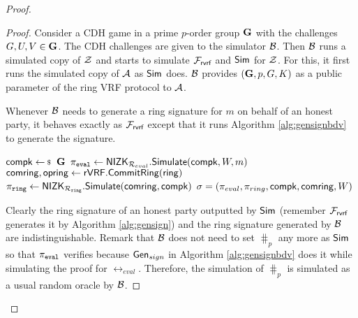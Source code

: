 \begin{proof}
\begin{proof}
			Consider a CDH game in a prime $ p $-order group  $ {\mathbf{G}} $ with the challenges $ G,U, V \in {\mathbf{G}}$. The CDH challenges are given to the simulator $ \mathcal{B} $. Then $ \mathcal{B} $ runs a simulated copy of $ \mathcal{Z} $ and starts to simulate $ \mathcal{F}_{\textsf{rvrf}} $ and $ \mathsf{Sim} $ for $ \mathcal{Z} $. For this, it first runs the simulated copy of $ \mathcal{A} $ as $ \mathsf{Sim} $ does. $ \mathcal{B} $ provides $ ({\mathbf{G}}, p, G , K) $ as a public parameter of the ring VRF protocol to $ \mathcal{A} $.
			
			Whenever $ \mathcal{B} $ needs to generate a ring signature for $ m $ on behalf of an honest party, it behaves exactly as $ \mathcal{F}_{\textsf{rvrf}} $ except that it runs   Algorithm \ref{alg:gensignbdv} to generate the signature. 
			
			\begin{algorithm}
				\caption{$\gen_{sign}(\ring,W,\pk,\aux,m)$}
				\label{alg:gensignbdv}	 	
				\begin{algorithmic}[1]
					\State $ \compk\leftsample \grE$
					\State $ \pi_{\mathtt{eval}} \leftarrow {\ensuremath{\mathsf{NIZK}}}_{\mathcal{R}_{eval}}.{\mathsf{Simulate}}(\mathsf{compk}, W,m) $
					\State $ \mathsf{comring}, \mathsf{opring} \leftarrow {\ensuremath{\mathsf{rVRF}}}.{\mathsf{CommitRing}}(\mathsf{ring}) $
					\State $ \pi_{\mathtt{ring}} \leftarrow {\ensuremath{\mathsf{NIZK}}}_{\mathcal{R}_{\mathtt{ring}}}.{\mathsf{Simulate}}(\mathsf{comring}, \mathsf{compk}) $ 
					\State\Return$ \sigma = (\pi_{eval},\pi_{ring},\mathsf{compk},\mathsf{comring},W) $
				\end{algorithmic}
				
			\end{algorithm}
			
			
			Clearly the ring signature of an honest party outputted by $ \mathsf{Sim} $ (remember $ \mathcal{F}_{\textsf{rvrf}}$ generates it by Algorithm \ref{alg:gensign}) and the ring signature generated by $ \mathcal{B} $ are indistinguishable. Remark that $ \mathcal{B} $ does not need to set $ \hash_p $ any more as $ \mathsf{Sim} $ so that $ \pi_{\mathtt{eval}} $ verifies because $ \mathsf{Gen}_{sign} $ in Algorithm \ref{alg:gensignbdv} does it while simulating the proof for $ \rel_{eval} $. Therefore, the simulation of $ \hash_p $ is simulated as a usual random oracle by $ \mathcal{B} $.
			

\end{proof}
\end{proof}
